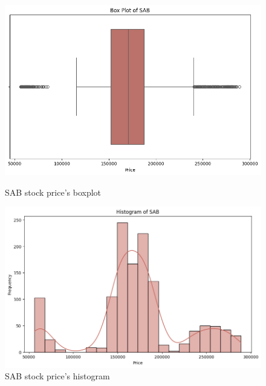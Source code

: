 \documentclass{ieeeojies}
\begin{document}
\begin{figure}[H]
    \centering
    \begin{minipage}{0.23\textwidth}
    \centering
    \includegraphics[width=1\textwidth]{BoxPlotOfSAB.png}
    \caption{SAB stock price's boxplot}
    \label{fig:1}
    \end{minipage}
    \hfill
    \begin{minipage}{0.23\textwidth}
    \centering
    \includegraphics[width=1\textwidth]{HistogramOfSAB.png}
    \caption{SAB stock price's histogram}
    \label{fig:2}
    \end{minipage}
\end{figure}
\end{document}
